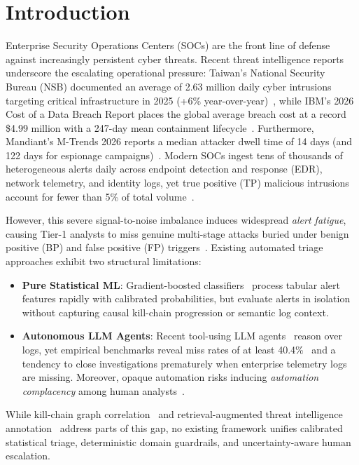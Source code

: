 \section{Introduction}

Enterprise Security Operations Centers (SOCs) are the front line of defense against increasingly persistent cyber threats. Recent threat intelligence reports underscore the escalating operational pressure: Taiwan's National Security Bureau (NSB) documented an average of 2.63 million daily cyber intrusions targeting critical infrastructure in 2025 (+6\% year-over-year)~\cite{nsb2025}, while IBM's 2026 Cost of a Data Breach Report places the global average breach cost at a record \$4.99 million with a 247-day mean containment lifecycle~\cite{ibm2026}. Furthermore, Mandiant's M-Trends 2026 reports a median attacker dwell time of 14 days (and 122 days for espionage campaigns)~\cite{mandiant2026}. Modern SOCs ingest tens of thousands of heterogeneous alerts daily across endpoint detection and response (EDR), network telemetry, and identity logs, yet true positive (TP) malicious intrusions account for fewer than 5\% of total volume~\cite{wei2025,alahmadi2022}.

However, this severe signal-to-noise imbalance induces widespread \emph{alert fatigue}, causing Tier-1 analysts to miss genuine multi-stage attacks buried under benign positive (BP) and false positive (FP) triggers~\cite{ndichu2026,alahmadi2022}. Existing automated triage approaches exhibit two structural limitations:
\begin{itemize}
    \item \textbf{Pure Statistical ML}: Gradient-boosted classifiers~\cite{freitas2024,freitas2026} process tabular alert features rapidly with calibrated probabilities, but evaluate alerts in isolation without capturing causal kill-chain progression or semantic log context.
    \item \textbf{Autonomous LLM Agents}: Recent tool-using LLM agents~\cite{wei2025,tsegai2026} reason over logs, yet empirical benchmarks reveal miss rates of at least 40.4\%~\cite{tsegai2026} and a tendency to close investigations prematurely when enterprise telemetry logs are missing. Moreover, opaque automation risks inducing \emph{automation complacency} among human analysts~\cite{tilbury2026}.
\end{itemize}

While kill-chain graph correlation~\cite{sadlek2025,garcia2025} and retrieval-augmented threat intelligence annotation~\cite{lekssays2025} address parts of this gap, no existing framework unifies calibrated statistical triage, deterministic domain guardrails, and uncertainty-aware human escalation.

